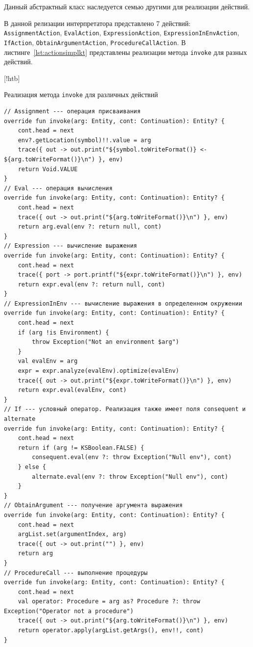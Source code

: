 \documentclass[14pt, russian]{scrartcl}
\newenvironment{longlisting}{\captionsetup{type=listing}}{}
\begin{document}
Данный абстрактный класс наследуется семью другими для реализации действий.

В данной релизации интерпретатора представлено 7 действий: \texttt{AssignmentAction}, \texttt{EvalAction}, \texttt{ExpressionAction}, \texttt{ExpressionInEnvAction}, \texttt{IfAction}, \texttt{ObtainArgumentAction}, \texttt{ProcedureCallAction}.
В листинге~\ref{lst:actionsimplkt} представлены реализации метода \texttt{invoke} для разных действий.

\begin{longlisting}[!htb]
\caption{Реализация метода \texttt{invoke} для различных действий}
\label{lst:actionsimplkt}
\begin{verbatim}
// Assignment --- операция присваивания
override fun invoke(arg: Entity, cont: Continuation): Entity? {
    cont.head = next
    env?.getLocation(symbol)!!.value = arg
    trace({ out -> out.print("${symbol.toWriteFormat()} <- ${arg.toWriteFormat()}\n") }, env)
    return Void.VALUE
}
// Eval --- операция вычисления
override fun invoke(arg: Entity, cont: Continuation): Entity? {
    cont.head = next
    trace({ out -> out.print("${arg.toWriteFormat()}\n") }, env)
    return arg.eval(env ?: return null, cont)
}
// Expression --- вычисление выражения
override fun invoke(arg: Entity, cont: Continuation): Entity? {
    cont.head = next
    trace({ port -> port.printf("${expr.toWriteFormat()}\n") }, env)
    return expr.eval(env ?: return null, cont)
}
// ExpressionInEnv --- вычисление выражения в определенном окружении
override fun invoke(arg: Entity, cont: Continuation): Entity? {
    cont.head = next
    if (arg !is Environment) {
        throw Exception("Not an environment $arg")
    }
    val evalEnv = arg
    expr = expr.analyze(evalEnv).optimize(evalEnv)
    trace({ out -> out.print("${expr.toWriteFormat()}\n") }, env)
    return expr.eval(evalEnv, cont)
}
// If --- условный оператор. Реализация также имеет поля consequent и alternate
override fun invoke(arg: Entity, cont: Continuation): Entity? {
    cont.head = next
    return if (arg != KSBoolean.FALSE) {
        consequent.eval(env ?: throw Exception("Null env"), cont)
    } else {
        alternate.eval(env ?: throw Exception("Null env"), cont)
    }
}
// ObtainArgument --- получение аргумента выражения
override fun invoke(arg: Entity, cont: Continuation): Entity? {
    cont.head = next
    argList.set(argumentIndex, arg)
    trace({ out -> out.print("") }, env)
    return arg
}
// ProcedureCall --- выполнение процедуры
override fun invoke(arg: Entity, cont: Continuation): Entity? {
    cont.head = next
    val operator: Procedure = arg as? Procedure ?: throw Exception("Operator not a procedure")
    trace({ out -> out.print("${arg.toWriteFormat()}\n") }, env)
    return operator.apply(argList.getArgs(), env!!, cont)
}
\end{verbatim}
\end{longlisting} %
\end{document}
